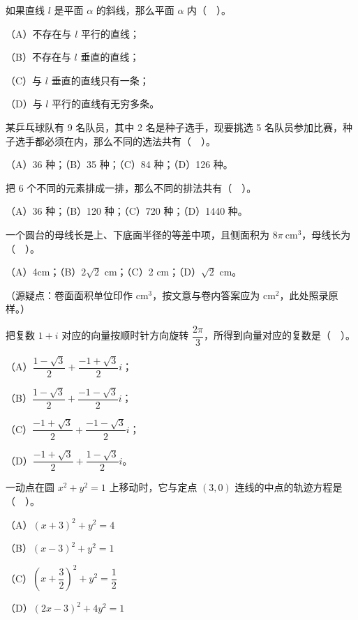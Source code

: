 \begin{question}
如果直线 $l$ 是平面 $\alpha$ 的斜线，那么平面 $\alpha$ 内（　）。

（A）不存在与 $l$ 平行的直线；

（B）不存在与 $l$ 垂直的直线；

（C）与 $l$ 垂直的直线只有一条；

（D）与 $l$ 平行的直线有无穷多条。

\end{question}
\begin{question}
某乒乓球队有 9 名队员，其中 2 名是种子选手，现要挑选 5 名队员参加比赛，种子选手都必须在内，那么不同的选法共有（　）。

（A）36 种；（B）35 种；（C）84 种；（D）126 种。

\end{question}
\begin{question}
把 6 个不同的元素排成一排，那么不同的排法共有（　）。

（A）36 种；（B）120 种；（C）720 种；（D）1440 种。

\end{question}
\begin{question}
一个圆台的母线长是上、下底面半径的等差中项，且侧面积为 $8\pi\ \mathrm{cm}^3$，母线长为（　）。

（A）4cm；（B）$2\sqrt2$ cm；（C）2 cm；（D）$\sqrt2$ cm。

（源疑点：卷面面积单位印作 $\mathrm{cm}^3$，按文意与卷内答案应为 $\mathrm{cm}^2$，此处照录原样。）

\end{question}
\begin{question}
把复数 $1+i$ 对应的向量按顺时针方向旋转 $\dfrac{2\pi}{3}$，所得到向量对应的复数是（　）。

（A）$\dfrac{1-\sqrt3}{2}+\dfrac{-1+\sqrt3}{2}i$；

（B）$\dfrac{1-\sqrt3}{2}+\dfrac{-1-\sqrt3}{2}i$；

（C）$\dfrac{-1+\sqrt3}{2}+\dfrac{-1-\sqrt3}{2}i$；

（D）$\dfrac{-1+\sqrt3}{2}+\dfrac{1-\sqrt3}{2}i$。

\end{question}
\begin{question}
一动点在圆 $x^2+y^2=1$ 上移动时，它与定点 $(3,0)$ 连线的中点的轨迹方程是（　）。

（A）$(x+3)^2+y^2=4$

（B）$(x-3)^2+y^2=1$

（C）$\left(x+\dfrac32\right)^2+y^2=\dfrac12$

（D）$(2x-3)^2+4y^2=1$

\end{question}

